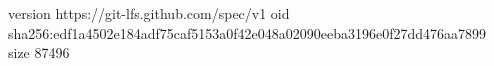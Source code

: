 version https://git-lfs.github.com/spec/v1
oid sha256:edf1a4502e184adf75caf5153a0f42e048a02090eeba3196e0f27dd476aa7899
size 87496
